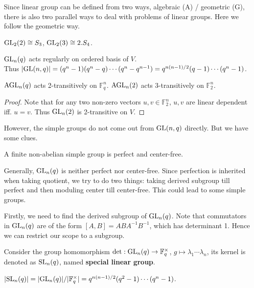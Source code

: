 \documentclass[a4paper,11pt]{article}
\begin{document}
Since linear group can be defined from two ways, algebraic (A) / geometric (G), there is also two parallel ways to deal with problems of linear groups. 
Here we follow the geometric way.

\begin{example}
    $\mathrm{GL}_2(2)\cong S_3$, $\mathrm{GL}_2(3)\cong 2.S_4$.
\end{example}

\begin{remark}
    $\mathrm{GL}_n(q)$ acts regularly on ordered basis of $V$. \\Thus
    $|\mathrm{GL}(n,q)|=(q^n-1)(q^n-q)\cdots(q^n-q^{n-1})=q^{n(n-1)/2}(q-1)\cdots(q^n-1)$.
\end{remark}

\begin{corollary}
    $\mathrm{AGL}_n(q)$ acts 2-transitively on $\mathbb{F}_q^n$. $\mathrm{AGL}_n(2)$ acts 3-transitively on $\mathbb{F}_2^n$. 
\end{corollary}
\begin{proof}
    Note that for any two non-zero vectors $u,v\in\mathbb{F}_2^n$, $u,v$ are linear dependent iff. $u=v$. Thus $\mathrm{GL}_n(2)$ is 2-transitive on $V$.
\end{proof}

However, the simple groups do not come out from $\mathrm{GL}(n,q)$ directly. But we have some clues.

\begin{proposition}
    A finite non-abelian simple group is perfect and center-free.
\end{proposition}

Generally, $\mathrm{GL}_n(q)$ is neither perfect nor center-free. Since perfection is inherited when taking quotient, we try to do two things: taking derived subgroup till perfect and then moduling center till center-free. This could lead to some simple groups.

Firstly, we need to find the derived subgroup of $\mathrm{GL}_n(q)$. Note that commutators in $\mathrm{GL}_n(q)$ are of the form $[A,B]=ABA^{-1}B^{-1}$, which has determinant 1. Hence we can restrict our scope to a subgroup.

\begin{definition}
    Consider the group homomorphism $\mathrm{det}:\mathrm{GL}_n(q)\to \mathbb{F}_q^\times$, $g\mapsto \lambda_1\cdots\lambda_n$, its kernel is denoted as $\mathrm{SL}_n(q)$, named \textbf{special linear group}.
\end{definition}

\begin{remark}
    $|\mathrm{SL}_n(q)|=|\mathrm{GL}_n(q)|/|\mathbb{F}_q^\times|=q^{n(n-1)/2}(q^2-1)\cdots(q^n-1)$.
\end{remark}
\end{document}
